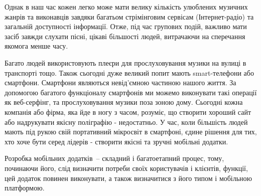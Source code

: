     Однак в наш час кожен легко може мати велику кількість улюблених музичних жанрів та виконавців завдяки багатьом стрімінговим сервісам (Інтернет-радіо) та загальній доступності інформації. Отже, під час групових подій, важливо мати засіб завжди слухати пісні, цікаві більшості людей, витрачаючи на сперечання якомога менше часу.

    Багато людей використовують плеєри для прослуховування музики на вулиці в транспорті тощо. Також сьогодні дуже великий попит мають smart-телефони або смартфони. Смартфони являються невід’ємною частиною нашого життя. За допомогою багатого функціоналу смартфонів ми можемо виконувати такі операції як веб-серфінг, та прослуховування музики поза зоною дому. Сьогодні кожна компанія або фірма, яка йде в ногу з часом, розуміє, що створити хороший сайт або надрукувати якісну поліграфію - недостатньо. У час, коли більшість людей мають під рукою свій портативний мікросвіт в смартфоні, єдине рішення для тих, хто хоче бути серед лідерів - створити якісні та зручні мобільні додатки.

    Розробка мобільних додатків – складний і багатоетапний процес, тому, починаючи його, слід визначити потреби своїх користувачів і клієнтів, функції, цей додаток повинен виконувати, а також визначитися з його типом і мобільною платформою.
